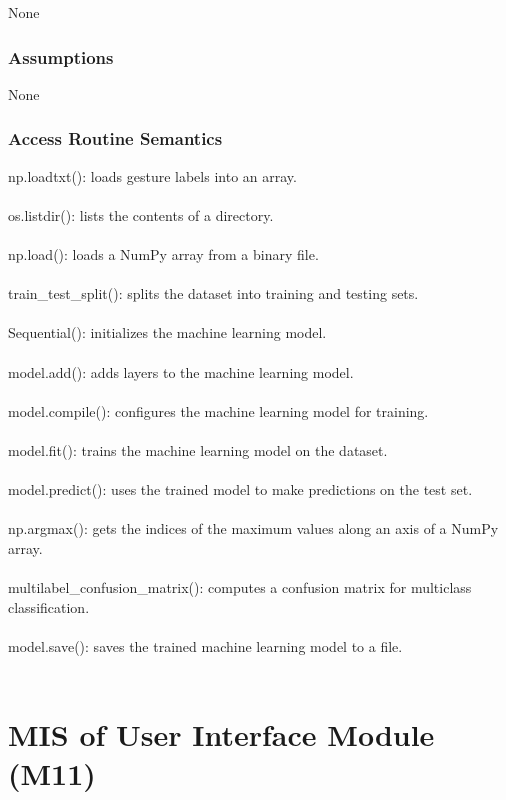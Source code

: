 \documentclass[12pt, titlepage]{article}
\begin{document}
None\\

\subsubsection{Assumptions}

None\\

\subsubsection{Access Routine Semantics}

np.loadtxt(): loads gesture labels into an array.\\
\\
os.listdir(): lists the contents of a directory.\\
\\
np.load(): loads a NumPy array from a binary file.\\
\\
train\_test\_split(): splits the dataset into training and testing sets.\\
\\
Sequential(): initializes the machine learning model.\\
\\
model.add(): adds layers to the machine learning model.\\
\\
model.compile(): configures the machine learning model for training.\\
\\
model.fit(): trains the machine learning model on the dataset.\\
\\
model.predict(): uses the trained model to make predictions on the test set.\\
\\
np.argmax(): gets the indices of the maximum values along an axis of a NumPy array.\\
\\
multilabel\_confusion\_matrix(): computes a confusion matrix for multiclass classification.\\
\\
model.save(): saves the trained machine learning model to a file.\\

~\newpage

\section{MIS of User Interface Module (M11)} \label{M11}
\end{document}
